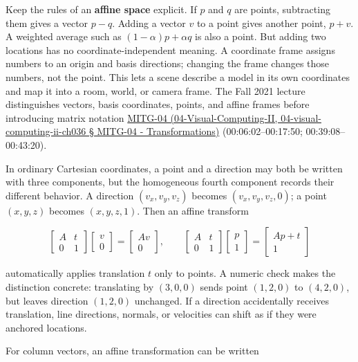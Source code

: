 Keep the rules of an \textbf{affine space} explicit. If \(p\) and \(q\) are points, subtracting them gives a vector \(p-q\). Adding a vector \(v\) to a point gives another point, \(p+v\). A weighted average such as \((1-\alpha)p+\alpha q\) is also a point. But adding two locations has no coordinate-independent meaning. A coordinate frame assigns numbers to an origin and basis directions; changing the frame changes those numbers, not the point. This lets a scene describe a model in its own coordinates and map it into a room, world, or camera frame. The Fall 2021 lecture distinguishes vectors, basis coordinates, points, and affine frames before introducing matrix notation \href{}{MITG-04 (04-Visual-Computing-II, 04-visual-computing-ii-ch036 § MITG-04 - Transformations)} (00:06:02--00:17:50; 00:39:08--00:43:20).

In ordinary Cartesian coordinates, a point and a direction may both be written with three components, but the homogeneous fourth component records their different behavior. A direction \((v_x,v_y,v_z)\) becomes \((v_x,v_y,v_z,0)\); a point \((x,y,z)\) becomes \((x,y,z,1)\). Then an affine transform

\[
\begin{bmatrix}A&t\\0&1\end{bmatrix}
\begin{bmatrix}v\\0\end{bmatrix}
=
\begin{bmatrix}Av\\0\end{bmatrix},
\qquad
\begin{bmatrix}A&t\\0&1\end{bmatrix}
\begin{bmatrix}p\\1\end{bmatrix}
=
\begin{bmatrix}Ap+t\\1\end{bmatrix}
\]

automatically applies translation \(t\) only to points. A numeric check makes the distinction concrete: translating by \((3,0,0)\) sends point \((1,2,0)\) to \((4,2,0)\), but leaves direction \((1,2,0)\) unchanged. If a direction accidentally receives translation, line directions, normals, or velocities can shift as if they were anchored locations.

For column vectors, an affine transformation can be written

